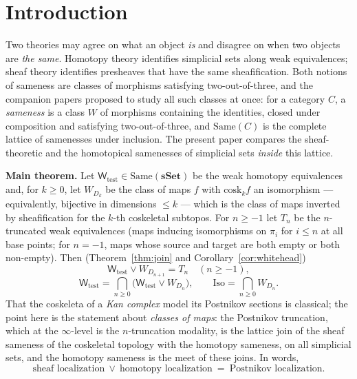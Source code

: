 \documentclass[11pt]{amsart}
\theoremstyle{definition}
\newcommand{\Same}{\mathrm{Same}}
\newcommand{\Iso}{\mathrm{Iso}}
\newcommand{\cosk}{\mathrm{cosk}}
\newcommand{\Wtest}{\mathsf{W}_{\mathrm{test}}}
\newcommand{\sset}{\mathbf{sSet}}
\begin{document}
\maketitle

\section{Introduction}

Two theories may agree on what an object \emph{is} and disagree on when two
objects are \emph{the same}. Homotopy theory identifies simplicial sets along
weak equivalences; sheaf theory identifies presheaves that have the same
sheafification. Both notions of sameness are classes of morphisms satisfying
two-out-of-three, and the companion papers \cite{SameA,SameB} proposed to
study all such classes at once: for a category $C$, a \emph{sameness} is a
class $W$ of morphisms containing the identities, closed under composition and
satisfying two-out-of-three, and $\Same(C)$ is the complete lattice of
samenesses under inclusion. The present paper compares the sheaf-theoretic
and the homotopical samenesses of simplicial sets \emph{inside} this lattice.

\medskip\noindent\textbf{Main theorem.} Let $\Wtest\in\Same(\sset)$ be the
weak homotopy equivalences and, for $k\ge0$, let $W_{D_k}$ be the class of
maps $f$ with $\cosk_kf$ an isomorphism --- equivalently, bijective in
dimensions $\le k$ --- which is the class of maps inverted by sheafification
for the $k$-th coskeletal subtopos. For $n\ge-1$ let $T_n$ be the
$n$-truncated weak equivalences (maps inducing isomorphisms on $\pi_i$ for
$i\le n$ at all base points; for $n=-1$, maps whose source and target are
both empty or both non-empty).
Then (Theorem~\ref{thm:join} and Corollary~\ref{cor:whitehead})
\[
\Wtest\vee W_{D_{n+1}}=T_n\quad(n\ge-1),
\]
\[
\Wtest=\bigcap_{n\ge0}\bigl(\Wtest\vee W_{D_n}\bigr),\qquad
\Iso=\bigcap_{n\ge0}W_{D_n}.
\]
That the coskeleta of a \emph{Kan complex} model its Postnikov sections is
classical; the point here is the statement about \emph{classes of maps}: the
Postnikov truncation, which at the $\infty$-level is the $n$-truncation
modality, is the lattice join of the sheaf sameness of the coskeletal
topology with the homotopy sameness, on all simplicial sets, and the homotopy
sameness is the meet of these joins. In words,
\[
\text{sheaf localization}\ \vee\ \text{homotopy localization}\ =\ \text{Postnikov localization}.
\]
\end{document}
